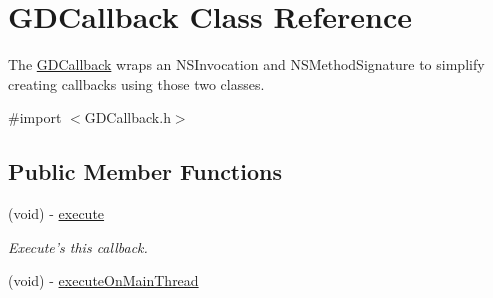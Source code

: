 \hypertarget{interface_g_d_callback}{
\section{GDCallback Class Reference}
\label{interface_g_d_callback}
}


The \hyperlink{interface_g_d_callback}{GDCallback} wraps an NSInvocation and NSMethodSignature to simplify creating callbacks using those two classes.  


{\ttfamily \#import $<$GDCallback.h$>$}\subsection*{Public Member Functions}
\begin{DoxyCompactItemize}
\item 
\hypertarget{interface_g_d_callback_a24e1f455a7fba1d23c7cb51f1b2222cd}{
(void) -\/ \hyperlink{interface_g_d_callback_a24e1f455a7fba1d23c7cb51f1b2222cd}{execute}}
\label{interface_g_d_callback_a24e1f455a7fba1d23c7cb51f1b2222cd}

\begin{DoxyCompactList}\small\item\em Execute's this callback. \item\end{DoxyCompactList}\item 
\hypertarget{interface_g_d_callback_aada3f0360fa4c8124ef94749d53fb0e8}{
(void) -\/ \hyperlink{interface_g_d_callback_aada3f0360fa4c8124ef94749d53fb0e8}{executeOnMainThread}}
\label{interface_g_d_callback_aada3f0360fa4c8124ef94749d53fb0e8}


\end{DoxyCompactItemize}
